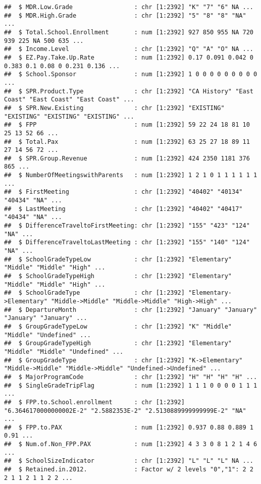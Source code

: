 \documentclass[
]{article}
\begin{document}
\begin{verbatim}
##  $ MDR.Low.Grade                 : chr [1:2392] "K" "7" "6" NA ...
##  $ MDR.High.Grade                : chr [1:2392] "5" "8" "8" "NA" ...
##  $ Total.School.Enrollment       : num [1:2392] 927 850 955 NA 720 939 225 NA 500 635 ...
##  $ Income.Level                  : chr [1:2392] "Q" "A" "O" NA ...
##  $ EZ.Pay.Take.Up.Rate           : num [1:2392] 0.17 0.091 0.042 0 0.383 0.1 0.08 0 0.231 0.136 ...
##  $ School.Sponsor                : num [1:2392] 1 0 0 0 0 0 0 0 0 0 ...
##  $ SPR.Product.Type              : chr [1:2392] "CA History" "East Coast" "East Coast" "East Coast" ...
##  $ SPR.New.Existing              : chr [1:2392] "EXISTING" "EXISTING" "EXISTING" "EXISTING" ...
##  $ FPP                           : num [1:2392] 59 22 24 18 81 10 25 13 52 66 ...
##  $ Total.Pax                     : num [1:2392] 63 25 27 18 89 11 27 14 56 72 ...
##  $ SPR.Group.Revenue             : num [1:2392] 424 2350 1181 376 865 ...
##  $ NumberOfMeetingswithParents   : num [1:2392] 1 2 1 0 1 1 1 1 1 1 ...
##  $ FirstMeeting                  : chr [1:2392] "40402" "40134" "40434" "NA" ...
##  $ LastMeeting                   : chr [1:2392] "40402" "40417" "40434" "NA" ...
##  $ DifferenceTraveltoFirstMeeting: chr [1:2392] "155" "423" "124" "NA" ...
##  $ DifferenceTraveltoLastMeeting : chr [1:2392] "155" "140" "124" "NA" ...
##  $ SchoolGradeTypeLow            : chr [1:2392] "Elementary" "Middle" "Middle" "High" ...
##  $ SchoolGradeTypeHigh           : chr [1:2392] "Elementary" "Middle" "Middle" "High" ...
##  $ SchoolGradeType               : chr [1:2392] "Elementary->Elementary" "Middle->Middle" "Middle->Middle" "High->High" ...
##  $ DepartureMonth                : chr [1:2392] "January" "January" "January" "January" ...
##  $ GroupGradeTypeLow             : chr [1:2392] "K" "Middle" "Middle" "Undefined" ...
##  $ GroupGradeTypeHigh            : chr [1:2392] "Elementary" "Middle" "Middle" "Undefined" ...
##  $ GroupGradeType                : chr [1:2392] "K->Elementary" "Middle->Middle" "Middle->Middle" "Undefined->Undefined" ...
##  $ MajorProgramCode              : chr [1:2392] "H" "H" "H" "H" ...
##  $ SingleGradeTripFlag           : num [1:2392] 1 1 1 0 0 0 0 1 1 1 ...
##  $ FPP.to.School.enrollment      : chr [1:2392] "6.3646170000000002E-2" "2.5882353E-2" "2.5130889999999999E-2" "NA" ...
##  $ FPP.to.PAX                    : num [1:2392] 0.937 0.88 0.889 1 0.91 ...
##  $ Num.of.Non_FPP.PAX            : num [1:2392] 4 3 3 0 8 1 2 1 4 6 ...
##  $ SchoolSizeIndicator           : chr [1:2392] "L" "L" "L" NA ...
##  $ Retained.in.2012.             : Factor w/ 2 levels "0","1": 2 2 2 1 1 2 1 1 2 2 ...
\end{verbatim}
\end{document}

